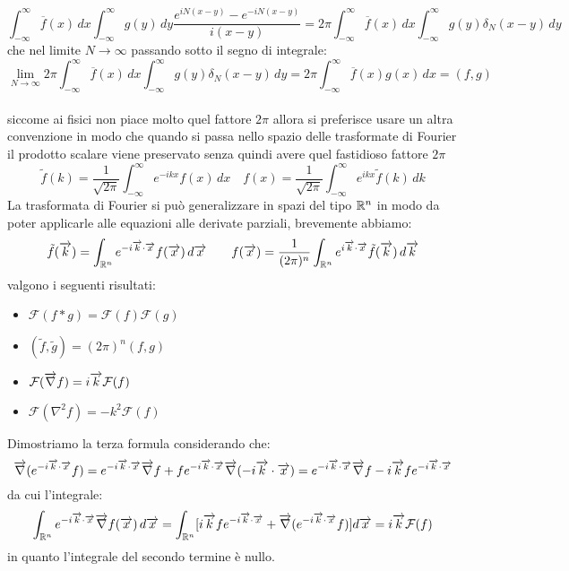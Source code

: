 \[\int_{-\infty}^\infty \overline{f}(x)\, dx \int_{-\infty}^\infty g(y)\,dy \frac{e^{iN(x-y)} - e^{-iN(x-y)}}{i(x-y)} = 2\pi\int_{-\infty}^\infty \overline{f}(x)\, dx \int_{-\infty}^\infty g(y)\delta_N(x-y)\,dy\]
che nel limite $N\to\infty$ passando sotto il segno di integrale:
\[\lim_{N\to\infty}2\pi\int_{-\infty}^\infty \overline{f}(x)\, dx \int_{-\infty}^\infty g(y)\delta_N(x-y)\,dy =  2\pi\int_{-\infty}^\infty \overline{f}(x)g(x)\, dx = (f,g) \]
\\
siccome ai fisici non piace molto quel fattore $2\pi$ allora si preferisce usare un altra convenzione in modo che quando si passa nello spazio delle trasformate di Fourier il prodotto scalare viene preservato senza quindi avere quel fastidioso fattore $2\pi$ 
\[\tilde{f}(k) = \frac{1}{\sqrt{2\pi}} \int_{-\infty}^\infty e^{-ikx}f(x)\, dx \quad f(x) = \frac{1}{\sqrt{2\pi}} \int_{-\infty}^\infty e^{ikx}\tilde{f}(k)\, dk \]
La trasformata di Fourier si può generalizzare in spazi del tipo $\mathbb{R}^n$ in modo da poter applicarle alle equazioni alle derivate parziali, brevemente abbiamo:
\[\tilde{f}(\overrightarrow{k}) =  \int_{\mathbb{R}^n} e^{-i\overrightarrow{k}\cdot\overrightarrow{x}}f(\overrightarrow{x})\, d\overrightarrow{x} \qquad f(\overrightarrow{x}) =  \frac{1}{(2\pi)^n}\int_{\mathbb{R}^n} e^{i\overrightarrow{k}\cdot\overrightarrow{x}}\tilde{f}(\overrightarrow{k})\, d\overrightarrow{k} \]
valgono i seguenti risultati:
\begin{itemize}
\item $\mathcal{F}(f*g)=\mathcal{F}(f)\mathcal{F}(g) $
\item $(\tilde{f},\tilde{g}) = (2\pi)^n(f,g)$
\item $\mathcal{F}(\overrightarrow{\nabla}f) = i\overrightarrow{k}\mathcal{F}(f)$
\item $\mathcal{F}(\nabla^2f) = -k^2\mathcal{F}(f)$
\end{itemize}
Dimostriamo la terza formula considerando che:
\[\overrightarrow{\nabla}(e^{-i\overrightarrow{k}\cdot\overrightarrow{x}}f) = e^{-i\overrightarrow{k}\cdot\overrightarrow{x}}\overrightarrow{\nabla}f + fe^{-i\overrightarrow{k}\cdot\overrightarrow{x}}\overrightarrow{\nabla}(-i\overrightarrow{k}\cdot\overrightarrow{x}) =   e^{-i\overrightarrow{k}\cdot\overrightarrow{x}}\overrightarrow{\nabla}f -i\overrightarrow{k} fe^{-i\overrightarrow{k}\cdot\overrightarrow{x}} \]
da cui l'integrale:
\[\int_{\mathbb{R}^n} e^{-i\overrightarrow{k}\cdot\overrightarrow{x}}\overrightarrow{\nabla}f(\overrightarrow{x})\, d\overrightarrow{x}  = \int_{\mathbb{R}^n} [i\overrightarrow{k} fe^{-i\overrightarrow{k}\cdot\overrightarrow{x}} + \overrightarrow{\nabla}(e^{-i\overrightarrow{k}\cdot\overrightarrow{x}}f)]d\overrightarrow{x} = i\overrightarrow{k}\mathcal{F}(f)\]
in quanto l'integrale del secondo termine è nullo.
